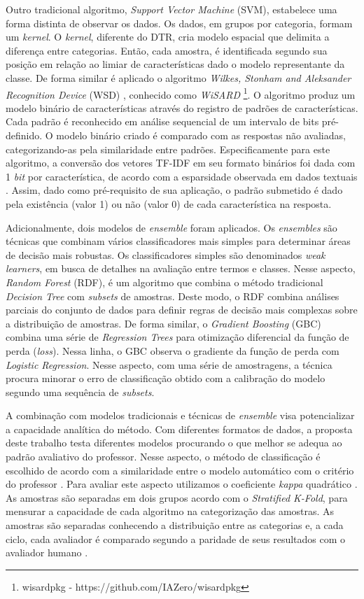 Outro tradicional algoritmo, \textit{Support Vector Machine} (SVM), estabelece uma forma distinta de observar os dados. Os dados, em grupos por categoria, formam um \textit{kernel}. O \textit{kernel}, diferente do DTR, cria modelo espacial que delimita a diferença entre categorias. Então, cada amostra, é identificada segundo sua posição em relação ao limiar de características dado o modelo representante da classe. De forma similar é aplicado o algoritmo \textit{Wilkes, Stonham and Aleksander Recognition Device} (WSD) \cite{aleksander1984, wisard2020}, conhecido como \textit{WiSARD} \footnote{wisardpkg - https://github.com/IAZero/wisardpkg}. O algoritmo produz um modelo binário de características através do registro de padrões de características. Cada padrão é reconhecido em análise sequencial de um intervalo de bits pré-definido. O modelo binário criado é comparado com as respostas não avaliadas, categorizando-as pela similaridade entre padrões. Especificamente para este algoritmo, a conversão dos vetores TF-IDF em seu formato binários foi dada com 1 \textit{bit} por característica, de acordo com a esparsidade observada em dados textuais \cite{manning1999}. Assim, dado como pré-requisito de sua aplicação, o padrão submetido é dado pela existência (valor 1) ou não (valor 0) de cada característica na resposta.

Adicionalmente, dois modelos de \textit{ensemble} foram aplicados. Os \textit{ensembles} são técnicas que combinam vários classificadores mais simples para determinar áreas de decisão mais robustas. Os classificadores simples são denominados \textit{weak learners}, em busca de detalhes na avaliação entre termos e classes. Nesse aspecto, \textit{Random Forest} (RDF), é um algoritmo que combina o método tradicional \textit{Decision Tree} com \textit{subsets} de amostras. Deste modo, o RDF combina análises parciais do conjunto de dados para definir regras de decisão mais complexas sobre a distribuição de amostras. De forma similar, o \textit{Gradient Boosting} (GBC) combina uma série de \textit{Regression Trees} para otimização diferencial da função de perda (\textit{loss}). Nessa linha, o GBC observa o gradiente da função de perda com \textit{Logistic Regression}. Nesse aspecto, com uma série de amostragens, a técnica procura minorar o erro de classificação obtido com a calibração do modelo segundo uma sequência de \textit{subsets}. 

A combinação com modelos tradicionais e técnicas de \textit{ensemble} visa potencializar a capacidade analítica do método. Com diferentes formatos de dados, a proposta deste trabalho testa diferentes modelos procurando o que melhor se adequa ao padrão avaliativo do professor. Nesse aspecto, o método de classificação é escolhido de acordo com a similaridade entre o modelo automático com o critério do professor \cite{pado2021}. Para avaliar este aspecto utilizamos o coeficiente \textit{kappa} quadrático \cite{cohen1960}. As amostras são separadas em dois grupos acordo com o \textit{Stratified K-Fold}, para mensurar a capacidade de cada algoritmo na categorização das amostras. As amostras são separadas conhecendo a distribuição entre as categorias e, a cada ciclo, cada avaliador é comparado segundo a paridade de seus resultados com o avaliador humano \cite{artstein2008}.

